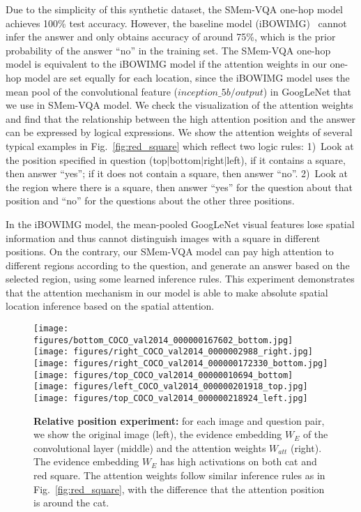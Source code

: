 Due to the simplicity of this synthetic dataset, the SMem-VQA one-hop model achieves 100\% test accuracy. However, the baseline model (iBOWIMG)~\cite{zhou2015simple} cannot infer the answer and only obtains accuracy of around 75\%, which is the prior probability of the answer ``no'' in the training set. The SMem-VQA one-hop model is equivalent to the iBOWIMG model if the attention weights in our one-hop model are set equally for each location, since the iBOWIMG model uses the mean pool of the convolutional feature ($inception\_5b/output$) in GoogLeNet that we use in SMem-VQA model. 
We check the visualization of the attention weights and find that the relationship between the high attention position and the answer can be expressed by logical expressions.
We show the attention weights of several typical examples in Fig.~\ref{fig:red_square} which reflect two logic rules:
1)~Look at the position specified in question (top$\mid$bottom$\mid$right$\mid$left), if it contains a square, then answer ``yes''; if it does not contain a square, then answer ``no''.
2)~Look at the region where there is a square, then answer ``yes'' for the question about that position and ``no'' for the questions about the other three positions.

In the iBOWIMG model, the mean-pooled GoogLeNet visual features lose spatial information and thus cannot distinguish images with a square in different positions. On the contrary, our SMem-VQA model can pay high attention to different regions according to the question, and generate an answer based on the selected region, using some learned inference rules.
This experiment demonstrates that the attention mechanism in our model is able to make absolute spatial location inference based on the spatial attention. 


\begin{figure*}[t]
  \texttt{[image: figures/bottom\_COCO\_val2014\_000000167602\_bottom.jpg]}
  \texttt{[image: figures/right\_COCO\_val2014\_0000002988\_right.jpg]}
  \texttt{[image: figures/right\_COCO\_val2014\_000000172330\_bottom.jpg]}\\
  \texttt{[image: figures/top\_COCO\_val2014\_00000010694\_bottom]}
  \texttt{[image: figures/left\_COCO\_val2014\_000000201918\_top.jpg]}
  \texttt{[image: figures/top\_COCO\_val2014\_000000218924\_left.jpg]}
\vspace{-0.05in}
\caption{\textbf{Relative position experiment:}
for each image and question pair, we show the original image (left), the evidence embedding $W_E$ of the convolutional layer (middle) and the attention weights $W_{att}$ (right). The evidence embedding $W_E$ has high activations on both cat and red square. 
The attention weights follow similar inference rules as in Fig.~\ref{fig:red_square}, with the difference that the attention position is around the cat.
}\label{fig:cat_square}
\vspace{-0.2in}
\end{figure*}



